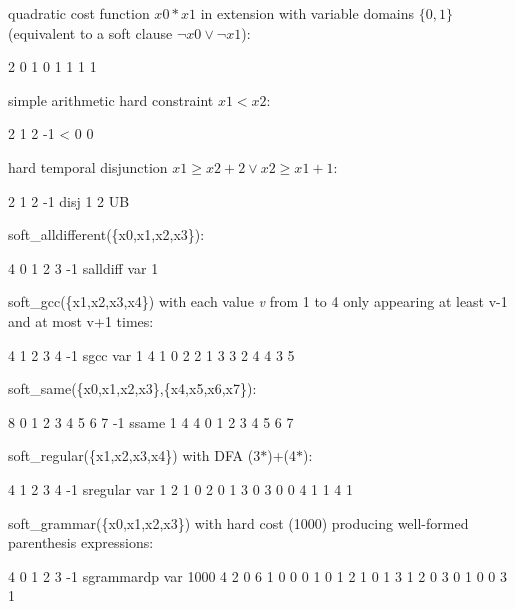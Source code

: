 \documentclass{article}
\begin{document}
\begin{DoxyItemize}
\item quadratic cost function $x0 * x1$ in extension with variable domains $\{0,1\}$ (equivalent to a soft clause $\neg x0 \vee \neg x1$)\-:
\begin{DoxyCode}
2 0 1 0 1 1 1 1 
\end{DoxyCode}

\item simple arithmetic hard constraint $x1 < x2$\-:
\begin{DoxyCode}
2 1 2 -1 < 0 0 
\end{DoxyCode}

\item hard temporal disjunction $x1 \geq x2 + 2 \vee x2 \geq x1 + 1$\-:
\begin{DoxyCode}
2 1 2 -1 disj 1 2 UB 
\end{DoxyCode}

\item soft\-\_\-alldifferent(\{x0,x1,x2,x3\})\-:
\begin{DoxyCode}
4 0 1 2 3 -1 salldiff var 1 
\end{DoxyCode}

\item soft\-\_\-gcc(\{x1,x2,x3,x4\}) with each value {\itshape v} from 1 to 4 only appearing at least v-\/1 and at most v+1 times\-:
\begin{DoxyCode}
4 1 2 3 4 -1 sgcc var 1 4 1 0 2 2 1 3 3 2 4 4 3 5 
\end{DoxyCode}

\item soft\-\_\-same(\{x0,x1,x2,x3\},\{x4,x5,x6,x7\})\-:
\begin{DoxyCode}
8 0 1 2 3 4 5 6 7 -1 ssame 1 4 4 0 1 2 3 4 5 6 7 
\end{DoxyCode}

\item soft\-\_\-regular(\{x1,x2,x3,x4\}) with D\-F\-A (3$\ast$)+(4$\ast$)\-:
\begin{DoxyCode}
4 1 2 3 4 -1 sregular var 1 2 1 0 2 0 1 3 0 3 0 0 4 1 1 4 1 
\end{DoxyCode}

\item soft\-\_\-grammar(\{x0,x1,x2,x3\}) with hard cost (1000) producing well-\/formed parenthesis expressions\-:
\begin{DoxyCode}
4 0 1 2 3 -1 sgrammardp var 1000 4 2 0 6 1 0 0 0 1 0 1 2 1 0 1 3 1 2 0 3 0 1 0 0 3 1 
\end{DoxyCode}


\end{DoxyItemize}
\end{document}
